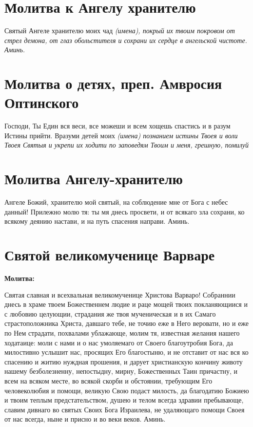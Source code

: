 \section{Молитва к Ангелу хранителю}
 





Святый Ангеле хранителю моих чад \itshape (имена)\normalfont{}, покрый их твоим покровом от стрел демона, от глаз обольстителя и сохрани их сердце в ангельской чистоте. Аминь. 





\section{Молитва о детях, преп. Амвросия Оптинского}
 


Господи, Ты Един вся веси, все можеши и всем хощешь спастись и в разум Истины прийти. Вразуми детей моих \itshape (имена)\normalfont{} познанием истины Твоея и воли Твоея Святыя и укрепи их ходити по заповедям Твоим и меня, грешную, помилуй


\section{Молитва Ангелу-хранителю}
 


Ангеле Божий, хранителю мой святый, на соблюдение мне от Бога с небес данный! Прилежно молю тя: ты мя днесь просвети, и от всякаго зла сохрани, ко всякому деянию настави, и на путь спасения направи. Аминь.


\section{Святой великомученице Варваре}
 
\bfseries Молитва:\normalfont{}


Святая славная и всехвальная великомученице Христова Варваро! Собраннии днесь в храме твоем Божественнем людие и раце мощей твоих покланяющиися и с любовию целующии, страдания же твоя мученическая и в их Самаго страстоположника Христа, давшаго тебе, не точию еже в Него веровати, но и еже по Нем страдати, похвалами ублажающе, молим тя, известная желания нашего ходатаице: моли с нами и о нас умоляемаго от Своего благоутробия Бога, да милостивно услышит нас, просящих Его благостыню, и не отставит от нас вся ко спасению и житию нуждная прошения, и дарует христианскую кончину животу нашему безболезненну, непостыдну, мирну, Божественных Таин причастну, и всем на всяком месте, во всякой скорби и обстоянии, требующим Его человеколюбия и помощи, великую Свою подаст милость, да благодатию Божиею и твоим теплым предстательством, душею и телом всегда здравии пребывающе, славим дивнаго во святых Своих Бога Израилева, не удаляющаго помощи Своея от нас всегда, ныне и присно и во веки веков. Аминь.\mychapterending


